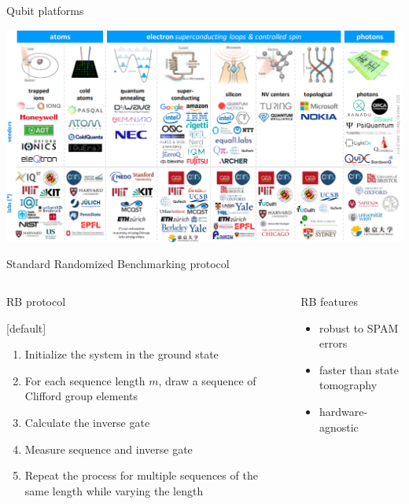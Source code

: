 \documentclass[aspectratio=169,10pt]{beamer}
\begin{document}
\begin{frame}{Qubit platforms}
  \begin{center}
      \includegraphics[height=0.82\textheight]{figures/platforms.png}
  \end{center}
\end{frame}

\begin{frame}[fragile]{Standard Randomized Benchmarking protocol}
    \begin{columns}
      \begin{column}{0.5\textwidth}
        RB protocol
      {[default]
       \begin{enumerate}[leftmargin=*, label=\arabic*.]
         \item Initialize the system in the ground state
         \item For each sequence length \( m \), draw a sequence of Clifford group elements
         \item Calculate the inverse gate 
         \item Measure sequence and inverse gate
         \item Repeat the process for multiple sequences of the same length while varying the length
       \end{enumerate}}
      \end{column}
      \begin{column}{0.5\textwidth}
        RB features
        \begin{itemize}
          \item robust to SPAM errors
          \item faster than state tomography
          \item hardware-agnostic 
        \end{itemize}
      \end{column}
    \end{columns}
\end{frame}
\end{document}
